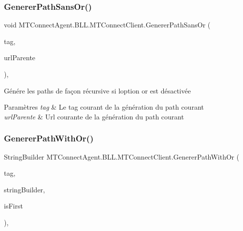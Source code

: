 \subsubsection{\texorpdfstring{Generer\+Path\+Sans\+Or()}{GenererPathSansOr()}}
{\footnotesize\ttfamily void M\+T\+Connect\+Agent.\+B\+L\+L.\+M\+T\+Connect\+Client.\+Generer\+Path\+Sans\+Or (\begin{DoxyParamCaption}\item[{\mbox{\hyperlink{class_m_t_connect_agent_1_1_model_1_1_tag}{Tag}}}]{tag,  }\item[{string}]{url\+Parente }\end{DoxyParamCaption})\hspace{0.3cm}{\ttfamily [inline]}, {\ttfamily [private]}}



Génére les paths de façon récursive si l\textquotesingle{}option or est désactivée 


\begin{DoxyParams}{Paramètres}
{\em tag} & Le tag courant de la génération du path courant\\
\hline
{\em url\+Parente} & Url courante de la génération du path courant\\
\hline
\end{DoxyParams}
\mbox{\label{class_m_t_connect_agent_1_1_b_l_l_1_1_m_t_connect_client_ae62829c685da54c7761cb892d292d190}} 
\subsubsection{\texorpdfstring{Generer\+Path\+With\+Or()}{GenererPathWithOr()}}
{\footnotesize\ttfamily String\+Builder M\+T\+Connect\+Agent.\+B\+L\+L.\+M\+T\+Connect\+Client.\+Generer\+Path\+With\+Or (\begin{DoxyParamCaption}\item[{\mbox{\hyperlink{interface_m_t_connect_agent_1_1_model_1_1_i_tag}{I\+Tag}}}]{tag,  }\item[{String\+Builder}]{string\+Builder,  }\item[{bool}]{is\+First }\end{DoxyParamCaption})\hspace{0.3cm}{\ttfamily [inline]}, {\ttfamily [private]}}

